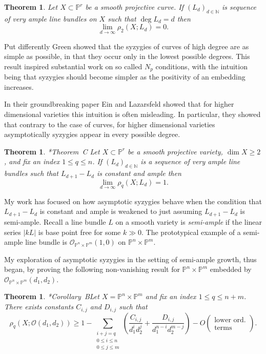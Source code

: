 \documentclass[10pt,reqno]{amsart}
\newtheorem{theorem}[lemma]{Theorem}
\theoremstyle{remark}
\renewcommand{\O}{\mathcal{O}}
\newcommand{\N}{\mathbb{N}}
\renewcommand{\P}{\mathbb{P}}
\begin{document}
\begin{theorem}
Let $X\subset \P^r$ be a smooth projective curve. If $(L_{d})_{d\in\N}$ is sequence of very ample line bundles on $X$ such that $\deg L_{d} = d$ then 
\[
\lim_{d\to \infty} \rho_{2}\left(X;L_{d}\right) = 0.
\]
\end{theorem}

Put differently Green showed that the syzygies of curves of high degree are as simple as possible, in that they occur only in the lowest possible degrees. This result inspired substantial work on so called $N_{p}$ conditions, with the intuition being that syzygies should become simpler as the positivity of an embedding increases.  

In their groundbreaking paper Ein and Lazarsfeld showed that for higher dimensional varieties this intuition is often misleading. In particular, they showed that contrary to the case of curves, for higher dimensional varieties  asymptotically syzygies appear in every possible degree. 
  
\begin{theorem}\cite{einLazarsfeld12}*{Theorem~C}
Let $X\subset \P^r$ be a smooth projective variety, $\dim X \geq2$, and fix an index $1\leq q \leq n$. If $(L_{d})_{d\in\N}$ is a sequence of very ample line bundles such that $L_{d+1}-L_{d}$ is constant and ample then
\[
\lim_{d\to\infty} \rho_{q}\left(X; L_d\right) = 1.
\]
\end{theorem}

My work has focused on how asymptotic syzygies behave when the condition that $L_{d+1}-L_{d}$ is constant and ample is weakened to just assuming $L_{d+1}-L_{d}$ is semi-ample. Recall a line bundle $L$ on a smooth variety is \textit{semi-ample} if the linear series $|kL|$ is base point free for some $k\gg0$. The prototypical example of a semi-ample line bundle is $\O_{\P^{n}\times\P^{m}}(1,0)$ on $\P^{n}\times \P^{m}$. 

My exploration of asymptotic syzygies in the setting of semi-ample growth, thus began, by proving the following non-vanishing result for $\P^{n}\times\P^{m}$ embedded by $\O_{\P^{n}\times\P^{m}}(d_{1},d_{2})$. 

\begin{theorem}\cite{bruce19-semiample}*{Corollary~B}\label{thm:bruce-semiample}
Let $X=\P^{n}\times\P^{m}$ and fix an index $1\leq q \leq n+m$. There exists constants $C_{i,j}$ and $D_{i,j}$ such that
\[
\rho_{q}\left(X; \O\left(d_1,d_2\right)\right)\geq1-\sum_{\substack{i+j=q \\ 0\leq i \leq n \\ 0\leq j \leq m}}\left(
\frac{C_{i,j}}{d_1^id_2^j}+\frac{D_{i,j}}{d_1^{n-i}d_2^{m-j}}\right)-O\left(\begin{matrix}\text{lower ord.}\\ \text{terms}\end{matrix}\right).
\]
\end{theorem}
\end{document}
